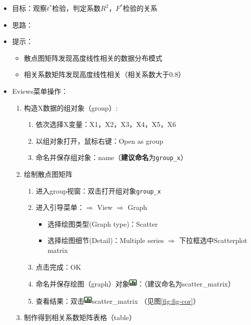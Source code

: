 \documentclass[12pt,(landscape,a4paper),(portrait,a4paper)]{article}
\providecommand{\tightlist}{%
  \setlength{\itemsep}{0pt}\setlength{\parskip}{0pt}}
\begin{document}
\begin{itemize}
\tightlist
\item
  目标：观察\(t^{\ast}\)检验，判定系数\(R^2\)，\(F^{\ast}\)检验的关系
\item
  思路：
\item
  提示：

  \begin{itemize}
  \tightlist
  \item
    散点图矩阵发现高度线性相关的数据分布模式
  \item
    相关系数矩阵发现高度线性相关（相关系数大于0.8）
  \end{itemize}
\item
  Eviews菜单操作：

  \begin{enumerate}
  \def\labelenumi{\arabic{enumi})}
  \tightlist
  \item
    构造X数据的组对象（group）:

    \begin{enumerate}
    \def\labelenumii{\alph{enumii}.}
    \tightlist
    \item
      依次选择X变量：X1，X2，X3，X4，X5，X6
    \item
      以组对象打开，鼠标右键：Open as group
    \item
      命名并保存组对象：name（\textbf{建议命名}为\texttt{group\_x}）
    \end{enumerate}
  \item
    绘制散点图矩阵

    \begin{enumerate}
    \def\labelenumii{\alph{enumii}.}
    \tightlist
    \item
      进入group视窗：双击打开组对象\texttt{group\_x}
    \item
      进入引导菜单：\(\Rightarrow\) View \(\Rightarrow\) Graph

      \begin{itemize}
      \tightlist
      \item
        选择绘图类型(Graph type)：Scatter
      \item
        选择绘图细节(Detail)：Multiple series \(\Rightarrow\)
        下拉框选中Scatterplot matrix
      \end{itemize}
    \item
      点击完成：OK
    \item
      命名并保存绘图（graph）对象\includegraphics{picture/object/Graph.png}：（建议命名为scatter\_matrix）
    \item
      查看结果：双击\includegraphics{picture/object/Graph.png}scatter\_matrix
      （见图\ref{fig:fig-cor}）
    \end{enumerate}
  \item
    制作得到相关系数矩阵表格（table）


\end{enumerate}
\end{itemize}
\end{document}
